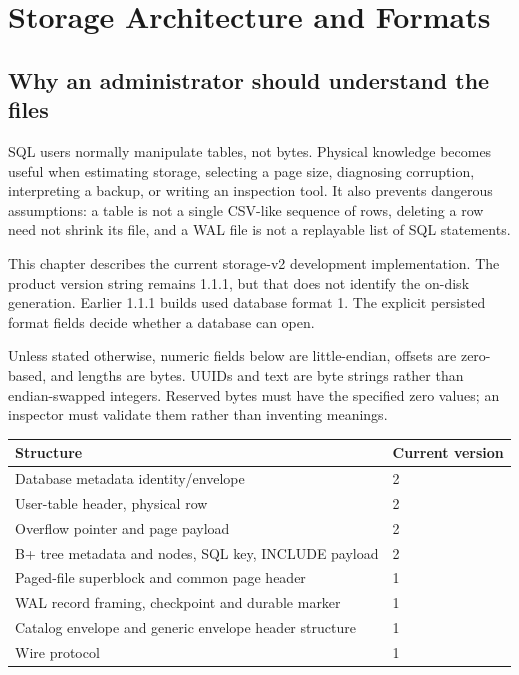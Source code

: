\chapter{Storage Architecture and Formats}
\label{adv:storage}

\section{Why an administrator should understand the files}

SQL users normally manipulate tables, not bytes. Physical knowledge becomes useful when estimating storage, selecting a page size, diagnosing corruption, interpreting a backup, or writing an inspection tool. It also prevents dangerous assumptions: a table is not a single CSV-like sequence of rows, deleting a row need not shrink its file, and a WAL file is not a replayable list of SQL statements.

This chapter describes the current storage-v2 development implementation. The product version string remains 1.1.1, but that does not identify the on-disk generation. Earlier 1.1.1 builds used database format 1. The explicit persisted format fields decide whether a database can open.


Unless stated otherwise, numeric fields below are little-endian, offsets are zero-based, and lengths are bytes. UUIDs and text are byte strings rather than endian-swapped integers. Reserved bytes must have the specified zero values; an inspector must validate them rather than inventing meanings.

\begin{longtable}{p{.56\linewidth}p{.33\linewidth}}
\toprule Structure & Current version \\\midrule
Database metadata identity/envelope & 2 \\
User-table header, physical row & 2 \\
Overflow pointer and page payload & 2 \\
B+ tree metadata and nodes, SQL key, INCLUDE payload & 2 \\
Paged-file superblock and common page header & 1 \\
WAL record framing, checkpoint and durable marker & 1 \\
Catalog envelope and generic envelope header structure & 1 \\
Wire protocol & 1 \\
\bottomrule
\end{longtable}

